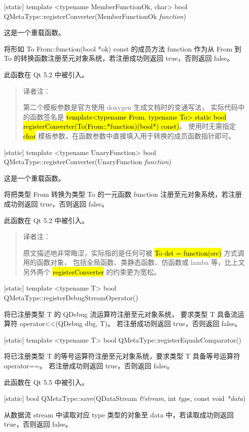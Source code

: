 [static] template <typename MemberFunctionOk, char> bool QMetaType::registerConverter(MemberFunctionOk \emph{function})

这是一个重载函数。

将形如 To From::function(bool *ok) const 的成员方法 function 作为从 From 到 To 的转换函数注册至元对象系统，若注册成功则返回 true，否则返回 false。

此函数在 Qt 5.2 中被引入。

\begin{quote}
译者注：

第二个模板参数是官方使用 doxygen 生成文档时的变通写法，
实际代码中的函数签名是 \hl{template<typename From, typename To> static bool registerConverter(To(From::*function)(bool*) const)}。
使用时无需指定 \hl{char} 模板参数，在函数参数中直接填入用于转换的成员函数指针即可。
\end{quote}


[static] template <typename UnaryFunction> bool QMetaType::registerConverter(UnaryFunction \emph{function})

这是一个重载函数。

将把类型 From 转换为类型 To 的一元函数 function 注册至元对象系统，若注册成功则返回 true，否则返回 false。

此函数在 Qt 5.2 中被引入。

\begin{quote}
译者注：

原文描述地非常晦涩，实际指的是任何可被 \hl{To dst = function(src)} 方式调用的函数对象，
包括全局函数、类静态函数、仿函数或 lamba 等，比上文另外两个 \hl{registerConverter} 的约束更为宽松。
\end{quote}


[static] template <typename T> bool QMetaType::registerDebugStreamOperator()

将已注册类型 T 的 QDebug 流运算符注册至元对象系统，
要求类型 T 具备流运算符 operator<<(QDebug dbg, T)。
若注册成功则返回 true，否则返回 false。

[static] template <typename T> bool QMetaType::registerEqualsComparator()

将已注册类型 T 的等号运算符注册至元对象系统，要求类型 T 具备等号运算符 operator==。
若注册成功则返回 true，否则返回 false。

此函数在 Qt 5.5 中被引入。

[static] bool QMetaType::save(QDataStream \emph{\&stream}, int \emph{type}, const void \emph{*data})

从数据流 stream 中读取对应 type 类型的对象至 data 中，若读取成功则返回 true，否则返回 false。

